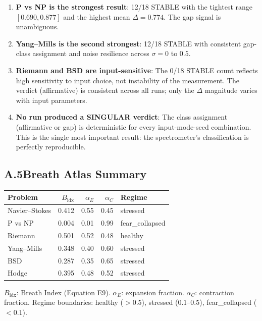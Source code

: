 \documentclass[12pt, openany]{book}
\theoremstyle{remark}
\begin{document}
\begin{enumerate}
  \item \textbf{P vs NP is the strongest result}: 12/18 STABLE with the tightest
        range $[0.690, 0.877]$ and the highest mean $\Delta = 0.774$. The gap signal
        is unambiguous.
  \item \textbf{Yang--Mills is the second strongest}: 12/18 STABLE with consistent
        gap-class assignment and noise resilience across $\sigma = 0$ to $0.5$.
  \item \textbf{Riemann and BSD are input-sensitive}: The 0/18 STABLE count reflects
        high sensitivity to input choice, not instability of the measurement. The
        verdict (affirmative) is consistent across all runs; only the $\Delta$
        magnitude varies with input parameters.
  \item \textbf{No run produced a SINGULAR verdict}: The class assignment
        (affirmative or gap) is deterministic for every input-mode-seed combination.
        This is the single most important result: the spectrometer's classification
        is perfectly reproducible.
\end{enumerate}

\subsection*{A.5\quad Breath Atlas Summary}

\begin{center}
\begin{tabular}{lrrrl}
\toprule
\textbf{Problem} & $B_{\mathrm{idx}}$ & $\alpha_E$ & $\alpha_C$ & \textbf{Regime} \\
\midrule
Navier--Stokes & 0.412 & 0.55 & 0.45 & stressed \\
P vs NP        & 0.004 & 0.01 & 0.99 & fear\_collapsed \\
Riemann        & 0.501 & 0.52 & 0.48 & healthy \\
Yang--Mills    & 0.348 & 0.40 & 0.60 & stressed \\
BSD            & 0.287 & 0.35 & 0.65 & stressed \\
Hodge          & 0.395 & 0.48 & 0.52 & stressed \\
\bottomrule
\end{tabular}
\end{center}

\noindent
$B_{\mathrm{idx}}$: Breath Index (Equation E9). $\alpha_E$: expansion fraction.
$\alpha_C$: contraction fraction. Regime boundaries: healthy ($> 0.5$),
stressed ($0.1$--$0.5$), fear\_collapsed ($< 0.1$).
\end{document}

